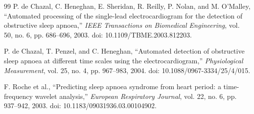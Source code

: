\begin{thebibliography}{99}
P. de Chazal, C. Heneghan, E. Sheridan, R. Reilly, P. Nolan, and M. O'Malley, ``Automated processing of the single-lead electrocardiogram for the detection of obstructive sleep apnoea,'' \textit{IEEE Transactions on Biomedical Engineering}, vol. 50, no. 6, pp. 686--696, 2003. doi: 10.1109/TBME.2003.812203.

P. de Chazal, T. Penzel, and C. Heneghan, ``Automated detection of obstructive sleep apnoea at different time scales using the electrocardiogram,'' \textit{Physiological Measurement}, vol. 25, no. 4, pp. 967--983, 2004. doi: 10.1088/0967-3334/25/4/015.

F. Roche et al., ``Predicting sleep apnoea syndrome from heart period: a time-frequency wavelet analysis,'' \textit{European Respiratory Journal}, vol. 22, no. 6, pp. 937--942, 2003. doi: 10.1183/09031936.03.00104902.



\end{thebibliography}